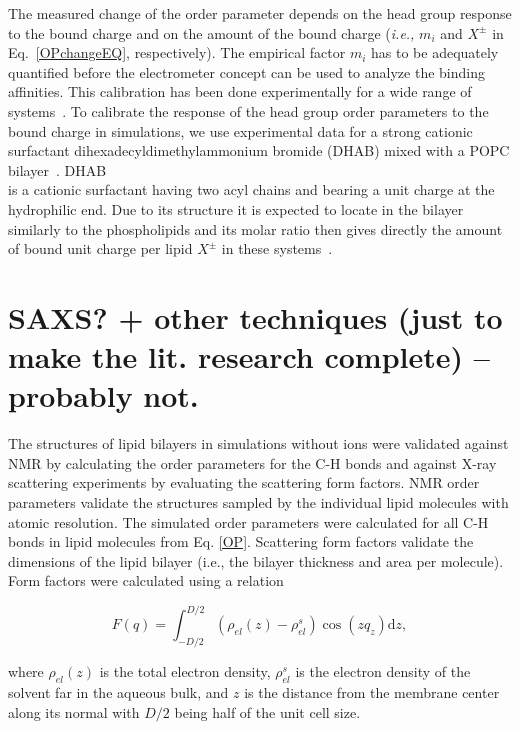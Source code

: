  
The measured change of the order parameter depends on the head group response to the bound charge and on the amount of the bound charge (\textit{i.e.,} $m_i$ and $X^\pm$ in Eq.~\ref{OPchangeEQ}, respectively).  
The empirical factor $m_i$ has to be adequately quantified before the electrometer concept can be used to analyze the binding affinities. 
This calibration has been done experimentally for a wide range of systems~\citep{seelig87, beschiasvili91}. 
To calibrate the response of the head group order parameters to the bound charge in simulations, we use experimental data for a strong cationic surfactant dihexadecyldimethylammonium bromide  (DHAB) mixed with a POPC bilayer~\citep{scherer89}. DHAB\\[0.5cm] 
is a cationic surfactant having two acyl chains and bearing a unit charge at the hydrophilic end. 
Due to its structure it is expected to locate in the bilayer similarly to the phospholipids and its molar ratio then gives directly the amount of bound unit charge per lipid $X^\pm$ in these systems~\citep{scherer89}. 
 
\section{SAXS? + other techniques (just to make the lit. research complete) -- probably not.}

The structures of lipid bilayers in simulations without ions were validated against NMR by calculating the order parameters for the C-H bonds and against \mbox{X-ray} scattering experiments by evaluating the scattering form factors. 
NMR order parameters validate the structures sampled by the individual lipid molecules with atomic resolution. 
The simulated order parameters were calculated for all C-H bonds in lipid molecules from Eq. \ref{OP}. 
Scattering form factors validate the dimensions of the lipid bilayer (i.e., the bilayer thickness and area per molecule). 
Form factors were calculated using a relation 
 
\begin{equation} 
  F(q) = \int _{-D/2} ^{D/2} \left ( \rho_{el}(z) - \rho_{el}^s \right ) \cos (zq_z) \mathrm{d}z, 
\end{equation} 
 
\noindent where $\rho_{el} (z)$ is the total electron density, $\rho_{el}^s$ is the electron density of the solvent far in the aqueous bulk, and $z$ is the distance from the membrane center along its normal with $D/2$ being half of the unit cell size.   

